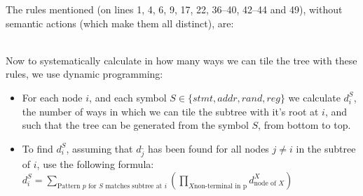 The rules mentioned (on lines 1, 4, 6, 9, 17, 22, 36–40, 42–44 and 49), without semantic actions (which make them all distinct), are:


\leavevmode
\\

Now to systematically calculate in how many ways we can tile the tree with these rules, we use dynamic programming:
\begin{itemize}
\item For each node $i$, and each symbol $S \in \{ stmt, addr, rand, reg \}$ we calculate $d_i^S$, the number of ways in which we can tile the subtree with it's root at $i$, and such that the tree can be generated from the symbol $S$, from bottom to top.
\item To find $d_i^S$, assuming that $d_j^\_$ has been found for all nodes $j \ne i$ in the subtree of $i$, use the following formula: \\
$d_i^S = \sum\limits_{\text{Pattern } p \text{ for } S \text { matches subtree at } i} (\prod\limits_{X \text{non-terminal in p}} d_{\text{node of } X}^X)$
\end{itemize}
\leavevmode
\par

